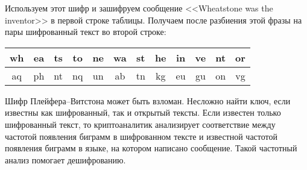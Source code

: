 \example
Используем этот шифр и зашифруем сообщение <<Wheatstone was the inventor>> в первой строке таблицы. Получаем после разбиения этой фразы на пары шифрованный текст во второй строке:
\begin{center} \begin{tabular}{|*{12}c|}
    \hline
    wh & ea & ts & to & ne & wa & st & he & in & ve & nt & or \\
    \hline
    aq & ph & nt & nq & un & ab & tn & kg & eu & gu & on & vg \\
    \hline
\end{tabular} \end{center}
\exampleend

Шифр Плейфера--Витстона может быть взломан. Несложно найти ключ, если известны как шифрованный, так и открытый тексты. Если известен только шифрованный текст, то криптоаналитик анализирует соответствие между частотой появления биграмм в шифрованном тексте и известной частотой появления биграмм в языке, на котором написано сообщение. Такой частотный анализ помогает дешифрованию.
